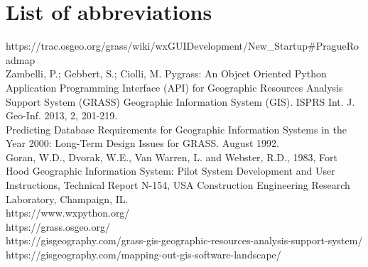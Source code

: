 \documentclass[a4paper,10pt,twoside]{article}
\begin{document}
\newpage
\vspace*{-1cm}
\section*{List of abbreviations}
\noindent
\large


\newpage
\vspace*{-6ex}
\renewcommand{\refname}{Bibliography} 
	
	

\noindent
\large

https://trac.osgeo.org/grass/wiki/wxGUIDevelopment/New\_Startup\#PragueRoadmap \\

Zambelli, P.; Gebbert, S.; Ciolli, M. Pygrass: An Object Oriented Python Application Programming Interface (API) for Geographic Resources Analysis Support System (GRASS) Geographic Information System (GIS). ISPRS Int. J. Geo-Inf. 2013, 2, 201-219. \\

Predicting Database Requirements for Geographic Information Systems in the Year 2000: Long-Term Design Issues for GRASS. August 1992.\\

Goran, W.D., Dvorak, W.E., Van Warren, L. and Webster, R.D., 1983, Fort Hood Geographic Information System: Pilot System Development and User Instructions, Technical Report N-154, USA Construction Engineering Research Laboratory, Champaign, IL.\\

https://www.wxpython.org/\\

https://grass.osgeo.org/\\

https://gisgeography.com/grass-gis-geographic-resources-analysis-support-system/\\

https://gisgeography.com/mapping-out-gis-software-landscape/\\
\end{document}
